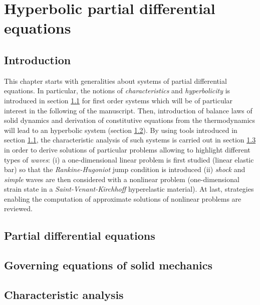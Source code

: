 \chapter{Hyperbolic partial differential equations}
\newpage
\section*{Introduction}
This chapter starts with generalities about systems of partial differential equations. In particular, the notions of \textit{characteristics} and \textit{hyperbolicity} is introduced in section \ref{sec:PDEs} for first order systems which will be of particular interest in the following of the manuscript.
Then, introduction of balance laws of solid dynamics and derivation of constitutive equations from the thermodynamics will lead to an hyperbolic system (section \ref{sec:solidMech_equations}). By using tools introduced in section \ref{sec:PDEs}, the characteristic analysis of such systems is carried out in section \ref{sec:characteristic_analysis} in order to derive solutions of particular problems allowing to highlight different types of \textit{waves}: (i) a one-dimensional linear problem is first studied (linear elastic bar) so that the \textit{Rankine-Hugoniot} jump condition is introduced (ii) \textit{shock} and \textit{simple} waves are then considered with a nonlinear problem (one-dimensional strain state in a \textit{Saint-Venant-Kirchhoff} hyperelastic material). At last, strategies enabling the computation of approximate solutions of nonlinear problems are reviewed.



\section{Partial differential equations}
\label{sec:PDEs}


\section{Governing equations of solid mechanics}
\label{sec:solidMech_equations}



\section{Characteristic analysis}
\label{sec:characteristic_analysis}



